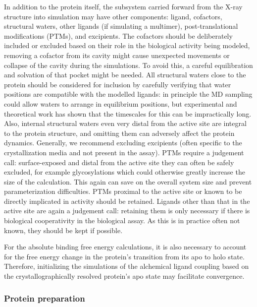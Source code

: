 \documentclass[9pt,bestpractices,pubversion]{livecoms}
\begin{document}
In addition to the protein itself, the subsystem carried forward from the X-ray structure into simulation may have other components: ligand, cofactors, structural waters, other ligands (if simulating a multimer), post-translational modifications (PTMs), and excipients. The cofactors should be deliberately included or excluded based on their role in the biological activity being modeled, removing a cofactor from its cavity might cause unexpected movements or collapse of the cavity during the simulations. To avoid this, a careful equilibration and solvation of that pocket might be needed. All structural waters close to the protein should be considered for inclusion by carefully verifying that water positions are compatible with the modelled ligands: in principle the MD sampling could allow waters to arrange in equilibrium positions, but experimental and theoretical work has shown that the timescales for this can be impractically long. Also, internal structural waters even very distal from the active site are integral to the protein structure, and omitting them can adversely affect the protein dynamics. Generally, we recommend excluding excipients (often specific to the crystallization media and not present in the assay). PTMs require a judgement call: surface-exposed and distal from the active site they can often be safely excluded, for example glycosylations which could otherwise greatly increase the size of the calculation. This again can save on the overall system size and prevent parameterization difficulties. PTMs proximal to the active site or known to be directly implicated in activity should be retained. Ligands other than that in the active site are again a judgement call: retaining them is only necessary if there is biological cooperativity in the biological assay. As this is in practice often not known, they should be kept if possible. 

For the absolute binding free energy calculations, it is also necessary to account for the free energy change in the protein's transition from its apo to holo state. Therefore, initializing the simulations of the alchemical ligand coupling based on the crystallographically resolved protein's apo state may facilitate convergence.

\subsubsection{Protein preparation}
\label{sec:protprep}
\end{document}
